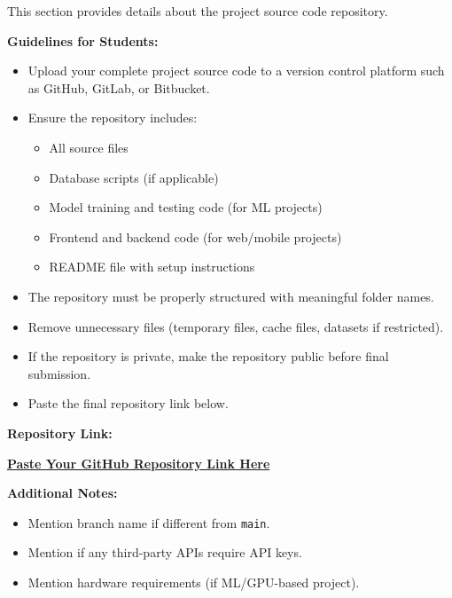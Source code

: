 This section provides details about the project source code repository.

\textbf{Guidelines for Students:}

\begin{itemize}
    \item Upload your complete project source code to a version control platform 
    such as GitHub, GitLab, or Bitbucket.
    
    \item Ensure the repository includes:
    \begin{itemize}
        \item All source files
        \item Database scripts (if applicable)
        \item Model training and testing code (for ML projects)
        \item Frontend and backend code (for web/mobile projects)
        \item README file with setup instructions
    \end{itemize}
    
    \item The repository must be properly structured with meaningful folder names.
    
    \item Remove unnecessary files (temporary files, cache files, datasets if restricted).
    
    \item If the repository is private, make the repository public before final submission.
    
    \item Paste the final repository link below.
\end{itemize}

\vspace{1cm}

\textbf{Repository Link:}

\begin{center}
\textbf{\url{Paste Your GitHub Repository Link Here}}
\end{center}

\vspace{1cm}

\textbf{Additional Notes:}

\begin{itemize}
    \item Mention branch name if different from \texttt{main}.
    \item Mention if any third-party APIs require API keys.
    \item Mention hardware requirements (if ML/GPU-based project).
\end{itemize}
